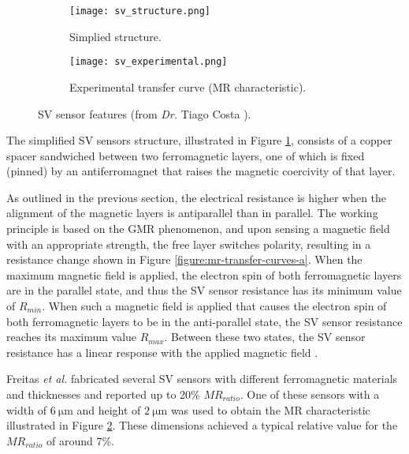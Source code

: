 \begin{figure}[!ht]
    \centering
    \begin{subfigure}[b]{.48\textwidth}
        \centering
        \texttt{[image: sv\_structure.png]}
        \caption{Simplied structure.}
        \label{figure:sv-structure}
    \end{subfigure}
    \hfill
    \centering
    \begin{subfigure}[b]{.48\textwidth}
        \centering
        \texttt{[image: sv\_experimental.png]}
        \caption{Experimental transfer curve (MR characteristic).}
        \label{figure:sv-characteristic}
    \end{subfigure}
    \caption{SV sensor features (from \textit{Dr.} Tiago Costa \cite{TiagoC_thesis}).}
    \label{figure:sv-sensor}
\end{figure}

The simplified \ac{SV} sensors structure, illustrated in Figure \ref{figure:sv-structure}, consists of a copper spacer sandwiched between two ferromagnetic layers, one of which is fixed (pinned) by an antiferromagnet that raises the magnetic coercivity of that layer.

As outlined in the previous section, the electrical resistance is higher when the alignment of the magnetic layers is antiparallel than in parallel. The working principle is based on the \ac{GMR} phenomenon, and upon sensing a magnetic field with an appropriate strength, the free layer switches polarity, resulting in a resistance change shown in Figure \ref{figure:mr-transfer-curves-a}. When the maximum magnetic field is applied, the electron spin of both ferromagnetic layers are in the parallel state, and thus the \ac{SV} sensor resistance has its minimum value of $R_{min}$. When such a magnetic field is applied that causes the electron spin of both ferromagnetic layers to be in the
anti-parallel state, the \ac{SV} sensor resistance reaches its maximum value $R_{max}$. Between these two states, the \ac{SV} sensor resistance has a linear response with the applied magnetic field \cite{TiagoC_thesis}.


Freitas \textit{et al.} \cite{freitas2007magnetoresistive} fabricated several \ac{SV} sensors with different ferromagnetic materials and thicknesses and reported up to 20\% $MR_{ratio}$. One of these sensors with a width of $\mathrm{6~\mu m}$ and height of $\mathrm{2~\mu m}$ was used to obtain the \ac{MR} characteristic illustrated in Figure \ref{figure:sv-characteristic}. These dimensions achieved a typical relative value for the $MR_{ratio}$ of around 7\%.

